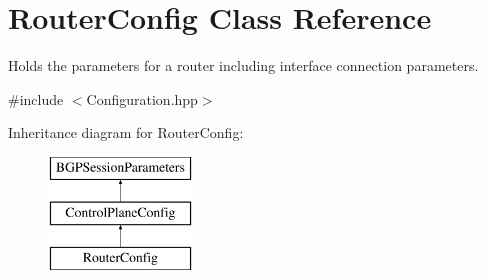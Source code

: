 \hypertarget{classRouterConfig}{\section{Router\-Config Class Reference}
\label{classRouterConfig}
}


Holds the parameters for a router including interface connection parameters.  




{\ttfamily \#include $<$Configuration.\-hpp$>$}

Inheritance diagram for Router\-Config\-:\begin{figure}[H]
\begin{center}
\leavevmode
\includegraphics[height=3.000000cm]{classRouterConfig}
\end{center}
\end{figure}
